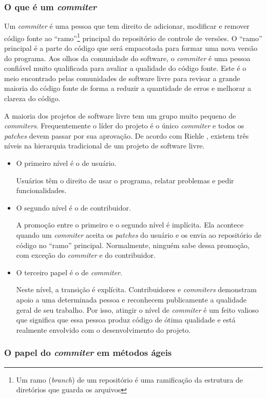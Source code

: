 \subsubsection{O que é um \emph{commiter}}

Um \emph{commiter} é uma pessoa que tem direito de adicionar,
modificar e remover código fonte ao ``ramo''\footnote{Um ramo
  (\emph{branch}) de um repositório é uma ramificação da estrutura de
  diretórios que guarda os arquivos} principal do repositório de
controle de versões. O ``ramo'' principal é a parte do código que será
empacotada para formar uma nova versão do programa. Aos olhos da
comunidade do software, o \emph{commiter} é uma pessoa confiável muito
qualificada para avaliar a qualidade do código fonte. Este é o meio
encontrado pelas comunidades de software livre para revisar a grande
maioria do código fonte de forma a reduzir a quantidade de erros e
melhorar a clareza do código.

A maioria dos projetos de software livre tem um grupo muito pequeno de
\emph{commiters}. Frequentemente o líder do projeto é o único
\emph{commiter} e todos os \emph{patches} devem passar por sua
aprovação. De acordo com Riehle \cite{Riehle2007}, existem três níveis
na hierarquia tradicional de um projeto de software livre.
\begin{itemize}
\item O primeiro nível é o de usuário.

  Usuários têm o direito de usar o programa, relatar problemas e pedir
  funcionalidades.
\item O segundo nível é o de contribuidor.

  A promoção entre o primeiro e o segundo nível é implícita. Ela
  acontece quando um \emph{commiter} aceita os \emph{patches} do
  usuário e os envia ao repositório de código no ``ramo''
  principal. Normalmente, ninguém sabe dessa promoção, com exceção do
  \emph{commiter} e do contribuidor.
\item O terceiro papel é o de \emph{commiter}.

  Neste nível, a transição é explícita. Contribuidores e
  \emph{commiters} demonstram apoio a uma determinada pessoa e
  reconhecem publicamente a qualidade geral de seu trabalho. Por isso,
  atingir o nível de \emph{commiter} é um feito valioso que significa
  que essa pessoa produz código de ótima qualidade e está realmente
  envolvido com o desenvolvimento do projeto.
\end{itemize}

\subsubsection{O papel do \emph{commiter} em métodos ágeis}

